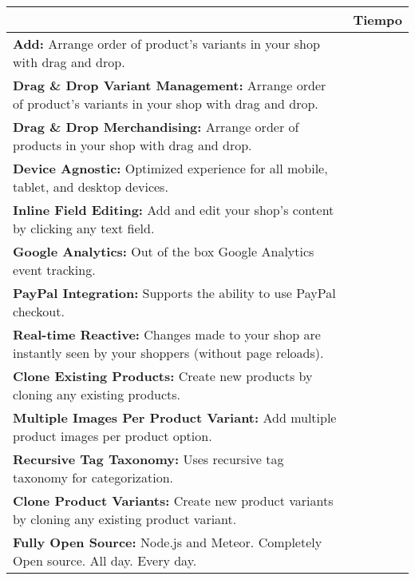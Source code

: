 \begin{table}[h!]
    \tiny
   
\begin{tabular}{ |L{0.6\paperwidth}|L{0.1\paperwidth}|}
\hline
	\task &
	Tiempo
	
\\ \hline
	\textbf{ Add:} Arrange order of product's variants in your shop with drag and drop.&
	
\\ \hline
	\textbf{ Drag \& Drop Variant Management:} Arrange order of product's variants in your shop with drag and drop.&
		
\\ \hline
	\textbf{ Drag \& Drop Merchandising:} Arrange order of products in your shop with drag and drop.&
		
\\ \hline
	\textbf{ Device Agnostic:} Optimized experience for all mobile, tablet, and desktop devices.&
		
\\ \hline
	 \textbf{ Inline Field Editing:} Add and edit your shop's content by clicking any text field.&
		
\\ \hline
	\textbf{ Google Analytics:} Out of the box Google Analytics event tracking.&
		
\\ \hline
	\textbf{ PayPal Integration:} Supports the ability to use PayPal checkout.&
		
\\ \hline
	\textbf{ Real-time Reactive:} Changes made to your shop are instantly seen by your shoppers (without page reloads).&
		
\\ \hline
	\textbf{ Clone Existing Products:} Create new products by cloning any existing products.&
		
\\ \hline
	\textbf{ Multiple Images Per Product Variant:} Add multiple product images per product option.&
		
\\ \hline
	\textbf{ Recursive Tag Taxonomy:} Uses recursive tag taxonomy for categorization.&
		
\\ \hline
	 \textbf{ Clone Product Variants:} Create new product variants by cloning any existing product variant.&
	
\\ \hline
	\textbf{ Fully Open Source:} Node.js and Meteor. Completely Open source. All day. Every day.&
	

\end{tabular}
\end{table}
